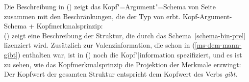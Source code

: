 Die Beschreibung in () zeigt das Kopf"=Argument"=Schema 
von Seite~\pageref{schema-bin-prel} zusammen mit den
Beschränkungen, die der Typ  von  erbt.
\eas
Kopf-Argument-Schema + Kopfmerkmalsprinzip:\\
\zs
() zeigt eine Beschreibung der Struktur, die durch das Schema~\ref{schema-bin-prel} lizenziert wird.
Zusätzlich zur Valenzinformation, die schon in (\ref{ms-dem-mann-gibt}) enthalten war,
ist in () noch die Kopf"|information spezifiziert, und es ist zu sehen, wie
das Kopfmerkmalsprinzip die Projektion der Merkmale erzwingt: Der Kopfwert der gesamten Struktur
 entspricht dem Kopfwert des Verbs \emph{gibt}.
\ea
{}
\z

